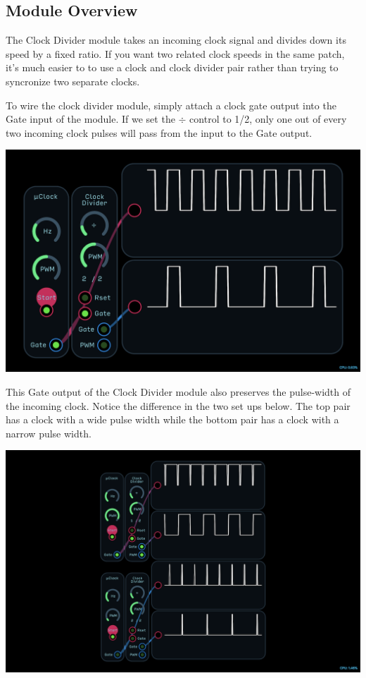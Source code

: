\documentclass[11pt]{book}
\begin{document}
\begin{multicols*}{2}

\subsection*{Module Overview}

The Clock Divider module takes an incoming clock signal and divides down its speed by a fixed ratio. If you want two related clock speeds in the same patch, it's much easier to to use a clock and clock divider pair rather than trying to syncronize two separate clocks.

To wire the clock divider module, simply attach a clock gate output into the Gate input of the module. If we set the $\div$ control to 1/2, only one out of every two incoming clock pulses will pass from the input to the Gate output.

\begin{center}
\includegraphics[width=0.95\linewidth]{clock-divider-fig1.png}
\end{center}

This Gate output of the Clock Divider module also preserves the pulse-width of the incoming clock. Notice the difference in the two set ups below. The top pair has a clock with a wide pulse width while the bottom pair has a clock with a narrow pulse width. 

\begin{center}
\includegraphics[width=0.95\linewidth]{clock-divider-fig2.png}
\end{center}


\end{multicols*}
\end{document}
